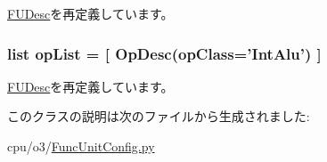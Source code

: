 \hyperlink{classFuncUnit_1_1FUDesc_adf167b42e49fa9d4114bff901e1b1c29}{FUDesc}を再定義しています。\hypertarget{classFuncUnitConfig_1_1IntALU_a31b2f9e3ac9a504397b140f513c469cc}{
\subsubsection[{opList}]{\setlength{\rightskip}{0pt plus 5cm}list {\bf opList} = \mbox{[} {\bf OpDesc}(opClass='IntAlu') \mbox{]}}}
\label{classFuncUnitConfig_1_1IntALU_a31b2f9e3ac9a504397b140f513c469cc}


\hyperlink{classFuncUnit_1_1FUDesc_aa7a0c51c9e0149c27f9e38f86005dfbe}{FUDesc}を再定義しています。

このクラスの説明は次のファイルから生成されました:\begin{DoxyCompactItemize}
\item 
cpu/o3/\hyperlink{FuncUnitConfig_8py}{FuncUnitConfig.py}\end{DoxyCompactItemize}
